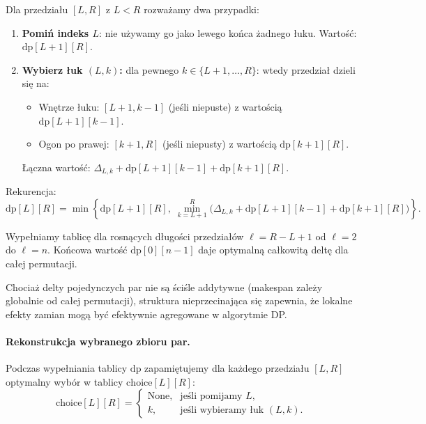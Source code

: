 Dla przedziału $[L, R]$ z $L < R$ rozważamy dwa przypadki:
\begin{enumerate}
  \item \textbf{Pomiń indeks $L$}: nie używamy go jako lewego końca żadnego łuku. Wartość: $\mathrm{dp}[L+1][R]$.
  
  \item \textbf{Wybierz łuk $(L, k)$:} dla pewnego $k \in \{L+1, \ldots, R\}$: wtedy przedział dzieli się na:
  \begin{itemize}
    \item Wnętrze łuku: $[L+1, k-1]$ (jeśli niepuste) z wartością $\mathrm{dp}[L+1][k-1]$.
    \item Ogon po prawej: $[k+1, R]$ (jeśli niepusty) z wartością $\mathrm{dp}[k+1][R]$.
  \end{itemize}
  Łączna wartość: $\Delta_{L,k} + \mathrm{dp}[L+1][k-1] + \mathrm{dp}[k+1][R]$.
\end{enumerate}

Rekurencja:
\begin{equation}\label{eq_dp_LR_req}\scriptstyle
\mathrm{dp}[L][R] = \min\left\{ 
  \mathrm{dp}[L+1][R], \; 
  \min_{k=L+1}^{R} \big( \Delta_{L,k} + \mathrm{dp}[L+1][k-1] + \mathrm{dp}[k+1][R] \big)
\right\}.
\end{equation}

Wypełniamy tablicę dla rosnących długości przedziałów $\ell = R - L + 1$ od $\ell=2$ do $\ell=n$. Końcowa wartość $\mathrm{dp}[0][n-1]$ daje optymalną całkowitą deltę dla całej permutacji.

Chociaż delty pojedynczych par nie są ściśle addytywne (makespan zależy globalnie od całej permutacji), struktura nieprzecinająca się zapewnia, że lokalne efekty zamian mogą być efektywnie agregowane w algorytmie DP.

\paragraph{Rekonstrukcja wybranego zbioru par.} Podczas wypełniania tablicy $\mathrm{dp}$ zapamiętujemy dla każdego przedziału $[L,R]$ optymalny wybór w tablicy $\mathrm{choice}[L][R]$:
\begin{equation}\label{eq_choise_LR}
\mathrm{choice}[L][R] = 
\begin{cases}
\text{None}, & \text{jeśli pomijamy } L, \\
k, & \text{jeśli wybieramy łuk } (L,k).
\end{cases}
\end{equation}

